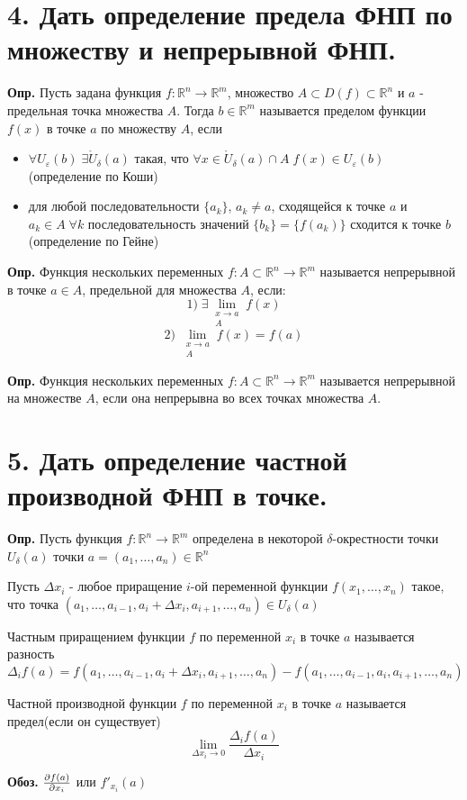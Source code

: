 \documentclass[11pt]{article}
\begin{document}
\section*{4. Дать определение предела ФНП по множеству и непрерывной ФНП.}
\par\textbf{Опр.} Пусть задана функция $f: \mathbb{R}^{n} \to \mathbb{R}^{m}$, множество $A \subset D(f) \subset \mathbb{R}^{n}$ и $a$ - предельная точка множества $A$. Тогда $b \in \mathbb{R}^{m}$ называется пределом функции $f(x)$ в точке $a$ по множеству $A$, если
\begin{itemize}
\item $\forall U_{\varepsilon}(b) \; \exists \mathring{U}_{\delta}(a)$ такая, что $\forall x \in \mathring{U}_{\delta}(a) \cap A \; f(x) \in U_{\varepsilon}(b)$ (определение по Коши)
\item для любой последовательности $\{ a_{k} \}$, $a_{k} \neq a$, сходящейся к точке $a$ и $a_{k} \in A \; \forall k$ последовательность значений $\{ b_{k} \} = \{ f(a_{k}) \}$ сходится к точке $b$ (определение по Гейне)
\end{itemize}
\par\textbf{Опр.} Функция нескольких переменных $f: A \subset \mathbb{R}^{n} \to \mathbb{R}^{m}$ называется непрерывной в точке $a \in A$, предельной для множества $A$, если:$$1) \; \exists \lim_{ \substack{x \to a \\ A}} f(x)$$
$$2) \; \lim_{ \substack{x \to a \\ A}} f(x) = f(a)$$
\par\textbf{Опр.} Функция нескольких переменных $f: A \subset \mathbb{R}^{n} \to \mathbb{R}^{m}$ называется непрерывной на множестве $A$, если она непрерывна во всех точках множества $A$.
\section*{5. Дать определение частной производной ФНП в точке.}
\par\textbf{Опр.} Пусть функция $f: \mathbb{R}^{n} \to \mathbb{R}^{m}$ определена в некоторой $\delta$-окрестности точки $U_{\delta}(a)$ точки $a = (a_{1}, \dots, a_{n}) \in \mathbb{R}^{n}$
\par Пусть $\Delta x_{i}$ - любое приращение $i$-ой переменной функции $f(x_{1}, \dots, x_{n})$ такое, что точка $(a_{1}, \dots, a_{i-1}, a_{i} + \Delta x_{i}, a_{i+1}, \dots, a_{n}) \in U_{\delta}(a)$
\par Частным приращением функции $f$ по переменной $x_{i}$ в точке $a$ называется разность $\Delta_i f(a) = f(a_{1}, \dots, a_{i-1}, a_{i} + \Delta x_{i}, a_{i+1}, \dots, a_{n}) - f(a_{1}, \dots, a_{i-1}, a_{i}, a_{i+1}, \dots, a_{n})$
\par Частной производной функции $f$ по переменной $x_{i}$ в точке $a$ называется предел(если он существует)$$\lim_{ \Delta x_{i} \to 0 } \frac{\Delta_{i}f(a)}{\Delta x_{i}}$$
\par\textbf{Обоз.} $\Large\frac{\partial f(a)}{\partial x_{i}}$ или $f'_{x_{i}}(a)$
\end{document}
